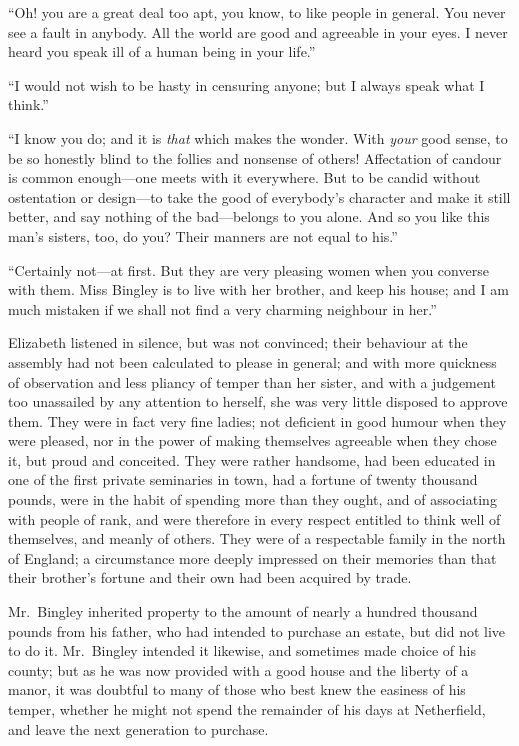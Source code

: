 ``Oh! you are a great deal too apt, you know, to like people in
general.  You never see a fault in anybody.  All the world are
good and agreeable in your eyes.  I never heard you speak ill of
a human being in your life.''

``I would not wish to be hasty in censuring anyone; but I always
speak what I think.''

``I know you do; and it is \emph{that} which makes the wonder.  With \emph{your}
good sense, to be so honestly blind to the follies and nonsense
of others!  Affectation of candour is common enough---one meets
with it everywhere.  But to be candid without ostentation or
design---to take the good of everybody's character and make it
still better, and say nothing of the bad---belongs to you alone.
And so you like this man's sisters, too, do you?  Their manners
are not equal to his.''

``Certainly not---at first.  But they are very pleasing women when
you converse with them.  Miss Bingley is to live with her
brother, and keep his house; and I am much mistaken if we shall
not find a very charming neighbour in her.''

Elizabeth listened in silence, but was not convinced; their
behaviour at the assembly had not been calculated to please in
general; and with more quickness of observation and less pliancy
of temper than her sister, and with a judgement too unassailed by
any attention to herself, she was very little disposed to approve
them.  They were in fact very fine ladies; not deficient in good
humour when they were pleased, nor in the power of making
themselves agreeable when they chose it, but proud and
conceited.  They were rather handsome, had been educated in
one of the first private seminaries in town, had a fortune of
twenty thousand pounds, were in the habit of spending more
than they ought, and of associating with people of rank, and
were therefore in every respect entitled to think well of
themselves, and meanly of others.  They were of a respectable
family in the north of England; a circumstance more deeply
impressed on their memories than that their brother's fortune
and their own had been acquired by trade.

Mr.\ Bingley inherited property to the amount of nearly a
hundred thousand pounds from his father, who had intended to
purchase an estate, but did not live to do it.  Mr.\ Bingley
intended it likewise, and sometimes made choice of his county;
but as he was now provided with a good house and the liberty of
a manor, it was doubtful to many of those who best knew the
easiness of his temper, whether he might not spend the
remainder of his days at Netherfield, and leave the next
generation to purchase.

